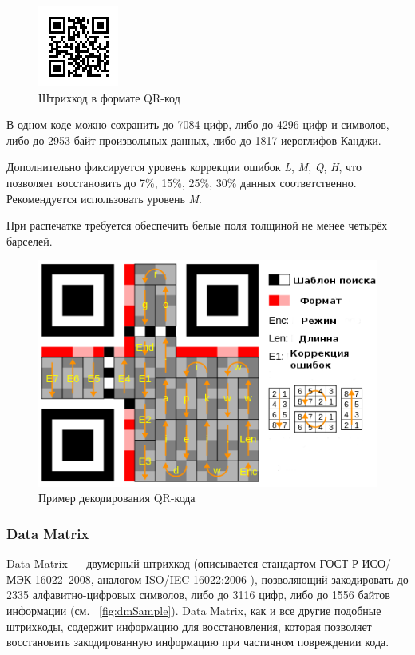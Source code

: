 \begin{figure}[h]
    \centering
    \includegraphics{img/qr_sample}
    \caption{Штрихкод в формате QR-код}
    \label{fig:qrSimple}
\end{figure}

В одном коде можно сохранить до 7084 цифр, либо до 4296 цифр и символов,
либо до 2953 байт произвольных данных, либо до 1817 иероглифов Канджи.

Дополнительно фиксируется уровень коррекции ошибок \textit{L}, 
\textit{M}, \textit{Q}, \textit{H}, что
позволяет восстановить до 7\%, 15\%, 25\%, 30\% данных соответственно.
Рекомендуется использовать уровень \textit{M}.

При распечатке требуется обеспечить белые поля толщиной не менее четырёх
барселей.

\begin{figure}[htb]
    \centering
    \includegraphics[scale=0.5]{img/qr_decode}
    \caption{Пример декодирования QR-кода}
    \label{fig:qrDecode}
\end{figure}


\subsubsection{Data Matrix}
Data Matrix --- двумерный штрихкод (описывается стандартом 
ГОСТ Р ИСО/МЭК 16022--2008, аналогом ISO/IEC 16022:2006 \cite{bib:gostDM}),
позволяющий 
закодировать до 2335 алфавитно-цифровых символов, либо до 3116 цифр, 
либо до 1556 байтов информации (см. \figurename\ \ref{fig:dmSample}). 
Data Matrix, как и все другие подобные 
штрихкоды, содержит информацию для восстановления, которая позволяет 
восстановить закодированную информацию при частичном повреждении кода.

